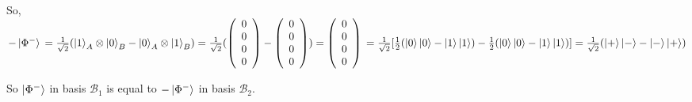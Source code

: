 \documentclass{article}
\begin{document}
\begin{enumerate}
        So, $-\ket{\Phi^-}
        \\=\frac{1}{\sqrt{2}}(\ket{1}_A\otimes\ket{0}_B-\ket{0}_A\otimes\ket{1}_B)
        \\=\frac{1}{\sqrt{2}}(\left(\begin{array}{c}
            0\\0\\0\\0
        \end{array}\right)-\left(\begin{array}{c}
            0\\0\\0\\0
        \end{array}\right))
        \\=\left(\begin{array}{c}
            0\\0\\0\\0
        \end{array}\right)
        \\=\frac{1}{\sqrt{2}}[\frac{1}{2}(\ket{0}\ket{0}-\ket{1}\ket{1})-\frac{1}{2}(\ket{0}\ket{0}-\ket{1}\ket{1})]
        \\=\frac{1}{\sqrt{2}}(\ket{+}\ket{-}-\ket{-}\ket{+})
        $

        So $\ket{\Phi^-}$ in basis $\mathcal{B}_1$ is equal to $-\ket{\Phi^-}$ in basis $\mathcal{B}_2$.
        
\end{enumerate}
\end{document}
